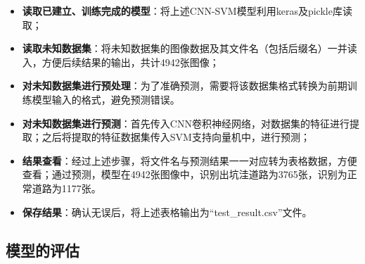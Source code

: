 \documentclass{MathorCupmodeling}
\begin{document}
	\begin{itemize}
		\item \textbf{读取已建立、训练完成的模型}：将上述CNN-SVM模型利用keras及pickle库读取；
		\item \textbf{读取未知数据集}：将未知数据集的图像数据及其文件名（包括后缀名）一并读入，方便后续结果的输出，共计4942张图像；
		\item \textbf{对未知数据集进行预处理}：为了准确预测，需要将该数据集格式转换为前期训练模型输入的格式，避免预测错误。
		\item \textbf{对未知数据集进行预测}：首先传入CNN卷积神经网络，对数据集的特征进行提取；之后将提取的特征数据集传入SVM支持向量机中，进行预测；
		\item \textbf{结果查看}：经过上述步骤，将文件名与预测结果一一对应转为表格数据，方便查看；通过预测，模型在4942张图像中，识别出坑洼道路为3765张，识别为正常道路为1177张。
		\item \textbf{保存结果}：确认无误后，将上述表格输出为“test\_result.csv”文件。
	\end{itemize}

	\subsection{模型的评估}\label{模型效果分析}
\end{document}
